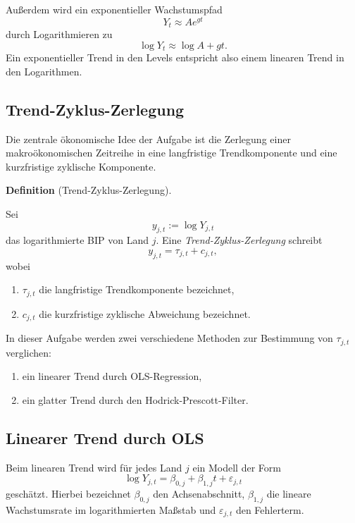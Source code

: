 \documentclass[10pt, letterpaper]{article}
\newcommand{\CustomHeading}[3]{%
  \par\medskip\noindent%
  \textbf{#1 #2} \textnormal{(#3)}.\enskip%
}
\newenvironment{DEF}[2]{\CustomHeading{Definition}{#1}{#2}}{}
\begin{document}
Außerdem wird ein exponentieller Wachstumspfad
\[
Y_t \approx A e^{gt}
\]
durch Logarithmieren zu
\[
\log Y_t \approx \log A + gt.
\]
Ein exponentieller Trend in den Levels entspricht also einem linearen Trend in den Logarithmen.

\subsection{Trend-Zyklus-Zerlegung}

Die zentrale ökonomische Idee der Aufgabe ist die Zerlegung einer makroökonomischen Zeitreihe in eine langfristige Trendkomponente und eine kurzfristige zyklische Komponente.

\begin{DEF}{}{Trend-Zyklus-Zerlegung}
Sei
\[
y_{j,t}:=\log Y_{j,t}
\]
das logarithmierte BIP von Land \(j\). Eine \emph{Trend-Zyklus-Zerlegung} schreibt
\[
y_{j,t}
=
\tau_{j,t}+c_{j,t},
\]
wobei
\begin{enumerate}
    \item \(\tau_{j,t}\) die langfristige Trendkomponente bezeichnet,
    \item \(c_{j,t}\) die kurzfristige zyklische Abweichung bezeichnet.
\end{enumerate}
\end{DEF}

In dieser Aufgabe werden zwei verschiedene Methoden zur Bestimmung von \(\tau_{j,t}\) verglichen:
\begin{enumerate}
    \item ein linearer Trend durch OLS-Regression,
    \item ein glatter Trend durch den Hodrick-Prescott-Filter.
\end{enumerate}

\subsection{Linearer Trend durch OLS}

Beim linearen Trend wird für jedes Land \(j\) ein Modell der Form
\[
\log Y_{j,t}
=
\beta_{0,j}
+
\beta_{1,j}t
+
\varepsilon_{j,t}
\]
geschätzt. Hierbei bezeichnet \(\beta_{0,j}\) den Achsenabschnitt, \(\beta_{1,j}\) die lineare Wachstumsrate im logarithmierten Maßstab und \(\varepsilon_{j,t}\) den Fehlerterm.
\end{document}
